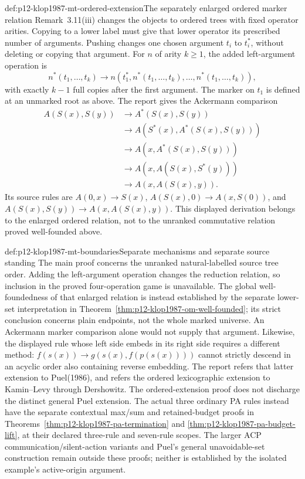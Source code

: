\begin{hbdefinition}{def:p12-klop1987-mt-ordered-extension}{The separately enlarged ordered marker relation}
Remark~3.11(iii) changes the objects to ordered trees with fixed
operator arities. Copying to a lower label must give that lower
operator its prescribed number of arguments. Pushing changes one
chosen argument \(t_i\) to \(t_i^*\), without deleting or copying
that argument. For \(n\) of arity \(k\geq1\), the added
left-argument operation is
\[
 n^*(t_1,\ldots,t_k)\longrightarrow
 n(t_1^*,n^*(t_1,\ldots,t_k),\ldots,n^*(t_1,\ldots,t_k)),
\]
with exactly \(k-1\) full copies after the first argument.
The marker on \(t_1\) is defined at an unmarked root as above.
The report gives the Ackermann comparison
\begin{align*}
 A(S(x),S(y))&\longrightarrow A^*(S(x),S(y))\\
 &\longrightarrow A(S^*(x),A^*(S(x),S(y)))\\
 &\longrightarrow A(x,A^*(S(x),S(y)))\\
 &\longrightarrow A(x,A(S(x),S^*(y)))\\
 &\longrightarrow A(x,A(S(x),y)).
\end{align*}
Its source rules are \(A(0,x)\to S(x)\),
\(A(S(x),0)\to A(x,S(0))\), and
\(A(S(x),S(y))\to A(x,A(S(x),y))\).
This displayed derivation belongs to the enlarged ordered relation,
not to the unranked commutative relation proved well-founded above.
\end{hbdefinition}

\begin{proofboundary}{def:p12-klop1987-mt-boundaries}{Separate mechanisms and separate source standing}
The main proof concerns the unranked natural-labelled source tree
order. Adding the left-argument operation changes the reduction
relation, so inclusion in the proved four-operation game is unavailable.
The global well-foundedness of that enlarged relation is instead
established by the separate lower-set interpretation in
Theorem~\ref{thm:p12-klop1987-om-well-founded}; its strict conclusion
concerns plain endpoints, not the whole marked universe. An Ackermann
marker comparison alone would not supply that argument. Likewise, the displayed
rule whose left side embeds in its right side requires a different
method: \(f(s(x))\to g(s(x),f(p(s(x))))\) cannot strictly descend
in an acyclic order also containing reverse embedding.
The report refers that latter extension to Puel(1986), and refers
the ordered lexicographic extension to Kamin--Levy through Dershowitz.
The ordered-extension proof does not discharge the distinct general
Puel extension. The actual three ordinary PA rules instead have the
separate contextual max/sum and retained-budget proofs in
Theorems~\ref{thm:p12-klop1987-pa-termination} and
\ref{thm:p12-klop1987-pa-budget-lift}, at their declared three-rule
and seven-rule scopes. The larger ACP communication/silent-action
variants and Puel's general unavoidable-set construction remain outside
these proofs; neither is established by the isolated example's
active-origin argument.
\end{proofboundary}
